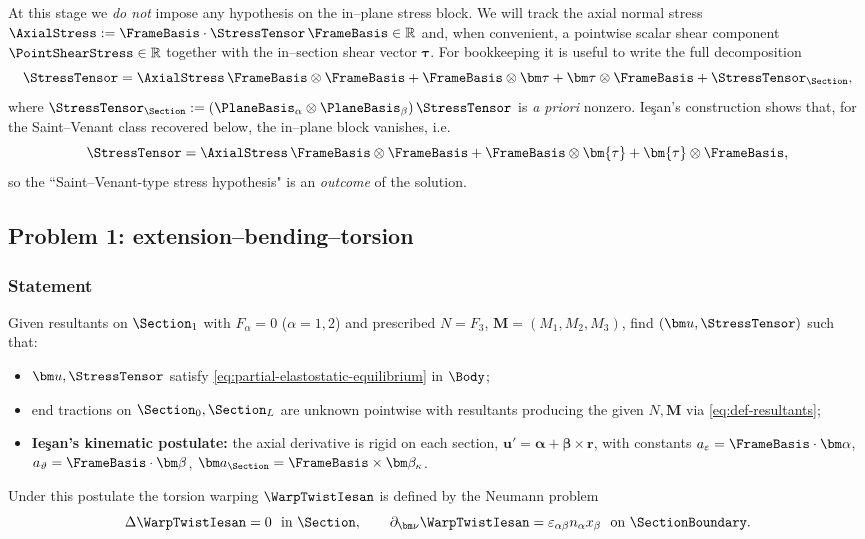 At this stage we \emph{do not} impose any hypothesis on the in–plane stress block.  
We will track the axial normal stress \(\AxialStress:=\FrameBasis\cdot\StressTensor\,\FrameBasis\in\mathbb{R}\) and, when convenient,
a pointwise scalar shear component \(\PointShearStress\in\mathbb{R}\) together with the in–section shear vector \(\bm\tau\).
For bookkeeping it is useful to write the full decomposition
\[
\StressTensor=\AxialStress\,\FrameBasis\otimes\FrameBasis
+\FrameBasis\otimes\bm\tau+\bm\tau\otimes\FrameBasis
+\StressTensor_{\Section},
\]
where \(\StressTensor_{\Section}:=(\PlaneBasis_\alpha\otimes\PlaneBasis_\beta)\,\StressTensor\) is \emph{a priori} nonzero.  
Ie\c{s}an’s construction shows that, for the Saint–Venant class recovered below, the in–plane block vanishes, i.e.
\begin{equation}
\StressTensor=\AxialStress\,\FrameBasis\otimes\FrameBasis
+\FrameBasis\otimes\bm{\tau}+\bm{\tau}\otimes\FrameBasis,
\label{eq:saint-venant-stress}
\end{equation}
so the ``Saint–Venant-type stress hypothesis" is an \emph{outcome} of the solution.

\subsection{Problem 1: extension--bending--torsion}

\subsubsection*{Statement}
Given resultants on \(\Section_1\) with \(F_\alpha=0\) (\(\alpha=1,2\)) and prescribed \(N=F_3\), \(\bm M=(M_1,M_2,M_3)\),
find \((\bm u,\StressTensor)\) such that:
\begin{itemize}
\item \(\bm u,\StressTensor\) satisfy \eqref{eq:partial-elastostatic-equilibrium} in \(\Body\);
\item end tractions on \(\Section_0,\Section_L\) are unknown pointwise with resultants producing the given \(N,\bm M\) via \eqref{eq:def-resultants};
\item \textbf{Ie\c{s}an’s kinematic postulate:} the axial derivative is rigid on each section,
\(
\bm u'=\bm\alpha+\bm\beta\times\bm{r}
\),
with constants \(a_\varepsilon=\FrameBasis\cdot\bm\alpha\),
\(a_\vartheta=\FrameBasis\cdot\bm\beta\),
\(\bm a_\Section=\FrameBasis\times\bm\beta_\kappa\).
\end{itemize}
Under this postulate the torsion warping \(\WarpTwistIesan\) is defined by the Neumann problem
\begin{equation}
\Delta\WarpTwistIesan=0\ \text{ in }\Section,\qquad
\partial_{\bm\nu}\WarpTwistIesan=\varepsilon_{\alpha\beta}n_\alpha x_\beta\ \text{ on }\SectionBoundary.
\label{eq:bvp-warp-twist}
\end{equation}

